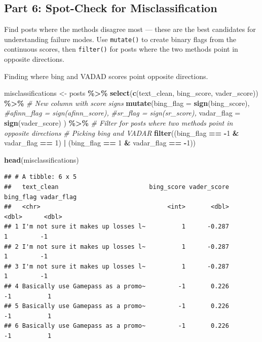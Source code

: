 \documentclass[
]{article}
\newenvironment{Shaded}{\begin{snugshade}}{\end{snugshade}}
\newcommand{\AttributeTok}[1]{\textcolor[rgb]{0.13,0.29,0.53}{#1}}
\newcommand{\CommentTok}[1]{\textcolor[rgb]{0.56,0.35,0.01}{\textit{#1}}}
\newcommand{\DecValTok}[1]{\textcolor[rgb]{0.00,0.00,0.81}{#1}}
\newcommand{\FunctionTok}[1]{\textcolor[rgb]{0.13,0.29,0.53}{\textbf{#1}}}
\newcommand{\NormalTok}[1]{#1}
\newcommand{\OtherTok}[1]{\textcolor[rgb]{0.56,0.35,0.01}{#1}}
\newcommand{\SpecialCharTok}[1]{\textcolor[rgb]{0.81,0.36,0.00}{\textbf{#1}}}
\begin{document}
\subsection{Part 6: Spot-Check for
Misclassification}\label{part-6-spot-check-for-misclassification}

Find posts where the methods disagree most --- these are the best
candidates for understanding failure modes. Use \texttt{mutate()} to
create binary flags from the continuous scores, then \texttt{filter()}
for posts where the two methods point in opposite directions.

Finding where bing and VADAD scores point opposite directions.

\begin{Shaded}
\begin{Highlighting}[]
\NormalTok{misclassifications }\OtherTok{\textless{}{-}}\NormalTok{ posts }\SpecialCharTok{\%\textgreater{}\%} 
  \FunctionTok{select}\NormalTok{(}\FunctionTok{c}\NormalTok{(text\_clean, bing\_score, vader\_score)) }\SpecialCharTok{\%\textgreater{}\%} 
  \CommentTok{\# New column with score signs }
  \FunctionTok{mutate}\NormalTok{(}\AttributeTok{bing\_flag =} \FunctionTok{sign}\NormalTok{(bing\_score),}
         \CommentTok{\#afinn\_flag = sign(afinn\_score),}
         \CommentTok{\#sr\_flag = sign(sr\_score),}
         \AttributeTok{vadar\_flag =} \FunctionTok{sign}\NormalTok{(vader\_score)}
\NormalTok{         ) }\SpecialCharTok{\%\textgreater{}\%} 
  \CommentTok{\# Filter for posts where two methods point in opposite directions }
  \CommentTok{\# Picking bing and VADAR }
  \FunctionTok{filter}\NormalTok{((bing\_flag }\SpecialCharTok{==} \SpecialCharTok{{-}}\DecValTok{1} \SpecialCharTok{\&}\NormalTok{ vadar\_flag }\SpecialCharTok{==} \DecValTok{1}\NormalTok{) }\SpecialCharTok{|} 
\NormalTok{         (bing\_flag }\SpecialCharTok{==} \DecValTok{1} \SpecialCharTok{\&}\NormalTok{ vadar\_flag }\SpecialCharTok{==} \SpecialCharTok{{-}}\DecValTok{1}\NormalTok{))}

\FunctionTok{head}\NormalTok{(misclassifications)}
\end{Highlighting}
\end{Shaded}

\begin{verbatim}
## # A tibble: 6 x 5
##   text_clean                         bing_score vader_score bing_flag vadar_flag
##   <chr>                                   <int>       <dbl>     <dbl>      <dbl>
## 1 I'm not sure it makes up losses l~          1      -0.287         1         -1
## 2 I'm not sure it makes up losses l~          1      -0.287         1         -1
## 3 I'm not sure it makes up losses l~          1      -0.287         1         -1
## 4 Basically use Gamepass as a promo~         -1       0.226        -1          1
## 5 Basically use Gamepass as a promo~         -1       0.226        -1          1
## 6 Basically use Gamepass as a promo~         -1       0.226        -1          1
\end{verbatim}
\end{document}
